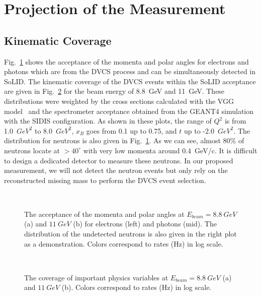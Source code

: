 \section{Projection of the Measurement}
\subsection{Kinematic Coverage}
Fig.~\ref{p_theta} shows the acceptance of the momenta and polar angles for electrons and photons which are from the DVCS process and can be simultaneously detected in SoLID. The kinematic coverage of the DVCS events within the SoLID acceptance are given in Fig.~\ref{kin_cor} for the beam energy of 8.8~GeV and 11~GeV. These distributions were weighted by the cross sections calculated with the VGG model~\cite{vgg} and the spectrometer acceptance obtained from the GEANT4 simulation with the SIDIS configuration. As shown in these plots, the range of $Q^{2}$ is from 1.0~$GeV^{2}$ to 8.0~$GeV^{2}$, $x_{B}$ goes from 0.1 up to 0.75, and $t$ up to -2.0~$GeV^{2}$.  The distribution for neutrons is also given in Fig.~\ref{p_theta}. As we can see, almost 80\% of neutrons locate at $>40^{\circ}$ with very low momenta around 0.4~GeV/c. It is difficult to design a dedicated detector to measure these neutrons. In our proposed measurement, we will not detect the neutron events but only rely on the reconstructed missing mass to perform the DVCS event selection.
\begin{figure}[!ht]
  \begin{center}
    \\
 \caption[The acceptance of the momenta and polar angles]{\footnotesize{The acceptance of the momenta and polar angles at $E_{beam}=8.8~GeV$ (a) and $11~GeV$ (b) for electrons (left) and photons (mid). The distribution of the undetected neutrons is also given in the right plot as a demonstration. Colors correspond to rates (Hz) in log scale.}}
  \label{p_theta}
  \end{center}
\end{figure}
\begin{figure}[!ht]
  \begin{center}
    \\
 \caption[The coverage of important physics variables]{\footnotesize{The coverage of important physics variables at $E_{beam}=8.8~GeV$ (a) and $11~GeV$ (b). Colors correspond to rates (Hz) in log scale.}}
  \label{kin_cor}
  \end{center}
\end{figure}
\clearpage

